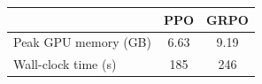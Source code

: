 \begin{tabular}{l c c}
  \toprule
  & \textbf{PPO} & \textbf{GRPO} \\
  \midrule
  Peak GPU memory (GB) & 6.63 & 9.19 \\
  Wall-clock time (s) & 185 & 246 \\
  \bottomrule
\end{tabular}
